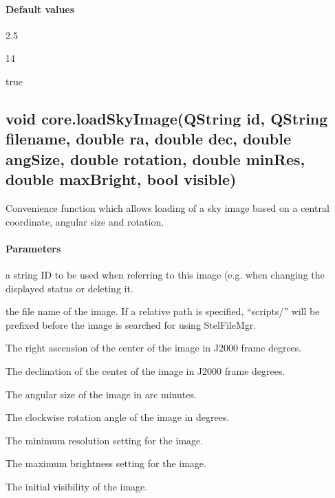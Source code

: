 \paragraph{Default values}
\begin{description}[align=right,labelwidth=3cm,leftmargin=3.2cm]
\item[\parameter{minRes}] 2.5
\item[\parameter{maxBright}] 14
\item[\parameter{visible}] true
\end{description}

\subsection{void core.loadSkyImage(QString id, QString filename, double ra, double dec, double angSize, double rotation, double minRes, double maxBright, bool visible)}
\label{sec:ScriptingAPI:core:loadSkyImage1}
Convenience function which allows loading of a sky image based on a central coordinate, angular size and rotation.

\paragraph{Parameters}
\begin{description}[align=right,labelwidth=3cm,leftmargin=3.2cm]
\item[\parameter{id}] a string ID to be used when referring to this image (e.g. when changing the displayed status or deleting it.
\item[\parameter{filename}] the file name of the image. If a relative path is specified, ``scripts/'' will be prefixed before the image is searched for using StelFileMgr.
\item[\parameter{ra}] The right ascension of the center of the image in J2000 frame degrees.
\item[\parameter{dec}] The declination of the center of the image in J2000 frame degrees.
\item[\parameter{angSize}] The angular size of the image in arc minutes.
\item[\parameter{rotation}] 	The clockwise rotation angle of the image in degrees.
\item[\parameter{minRes}] The minimum resolution setting for the image.
\item[\parameter{maxBright}] The maximum brightness setting for the image.
\item[\parameter{visible}] The initial visibility of the image.
\end{description}

